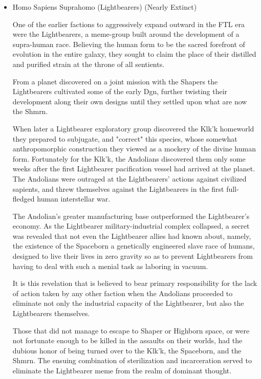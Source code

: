 \begin{itemize}
\item Homo Sapiens Suprahomo (Lightbearers) (Nearly Extinct) 

One of the earlier factions to aggressively expand outward in the FTL era were the Lightbearers, a meme-group built around the development of a supra-human race. Believing the human form to be the sacred forefront of evolution in the entire galaxy, they sought to claim the place of their distilled and purified strain at the throne of all sentients.

From a planet discovered on a joint mission with the Shapers the Lightbearers cultivated some of the early Dgn, further twisting their development along their own designs until they settled upon what are now the Shmrn.

When later a Lightbearer exploratory group discovered the Klk'k homeworld they prepared to subjugate, and "correct" this species, whose somewhat anthropomorphic construction they viewed as a mockery of the divine human form. Fortunately for the Klk'k, the Andolians discovered them only some weeks after the first Lightbearer pacification vessel had arrived at the planet. The Andolians were outraged at the Lightbearers' actions against civilized sapients, and threw themselves against the Lightbearers in the first full-fledged human interstellar war.

The Andolian's greater manufacturing base outperformed the Lightbearer's economy. As the Lightbearer military-industrial complex collapsed, a secret was revealed that not even the Lightbearer allies had known about, namely, the existence of the Spaceborn a genetically engineered slave race of humans, designed to live their lives in zero gravity so as to prevent Lightbearers from having to deal with such a menial task as laboring in vacuum.

It is this revelation that is believed to bear primary responsibility for the lack of action taken by any other faction when the Andolians proceeded to eliminate not only the industrial capacity of the Lightbearer, but also the Lightbearers themselves.

Those that did not manage to escape to Shaper or Highborn space, or were not fortunate enough to be killed in the assaults on their worlds, had the dubious honor of being turned over to the Klk'k, the Spaceborn, and the Shmrn.  The ensuing combination of sterilization and incarceration served to eliminate the Lightbearer meme from the realm of dominant thought.



\end{itemize}
